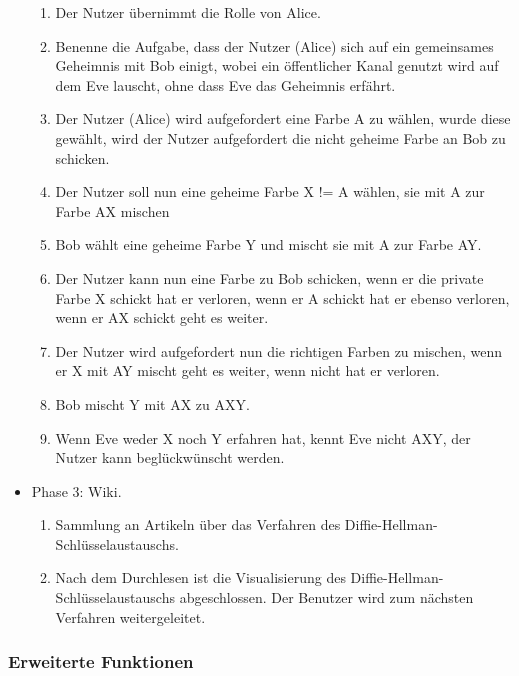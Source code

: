 \documentclass{article}
\begin{document}
\begin{itemize}[label={}]
	\begin{enumerate}
     \item Der Nutzer übernimmt die Rolle von Alice.
     \item Benenne die Aufgabe, dass der Nutzer (Alice) sich auf ein gemeinsames Geheimnis
           mit Bob einigt, wobei ein öffentlicher Kanal genutzt wird auf dem Eve lauscht,
           ohne dass Eve das Geheimnis erfährt.
     \item Der Nutzer (Alice) wird aufgefordert eine Farbe A zu wählen,
           wurde diese gewählt, wird der Nutzer aufgefordert
           die nicht geheime Farbe an Bob zu schicken.
     \item Der Nutzer soll nun eine geheime Farbe X != A wählen,
           sie mit A zur Farbe AX mischen
     \item Bob wählt eine geheime Farbe Y und mischt sie mit A zur Farbe AY.
     \item Der Nutzer kann nun eine Farbe zu Bob schicken,
           wenn er die private Farbe X schickt hat er verloren,
           wenn er A schickt hat er ebenso verloren,
           wenn er AX schickt geht es weiter.
     \item Der Nutzer wird aufgefordert nun die richtigen Farben zu mischen,
           wenn er X mit AY mischt geht es weiter, wenn nicht hat er verloren.
     \item Bob mischt Y mit AX zu AXY.
     \item Wenn Eve weder X noch Y erfahren hat, kennt Eve nicht AXY,
           der Nutzer kann beglückwünscht werden.
	\end{enumerate}

 \item Phase 3: Wiki.

	\begin{enumerate}
	 \item Sammlung an Artikeln über das Verfahren des Diffie-Hellman-Schlüsselaustauschs.
	 \item Nach dem Durchlesen ist die Visualisierung des Diffie-Hellman-Schlüsselaustauschs abgeschlossen. Der Benutzer wird zum nächsten Verfahren weitergeleitet.
 	\end{enumerate}

\end{itemize}

\subsubsection{Erweiterte Funktionen}
\end{document}
